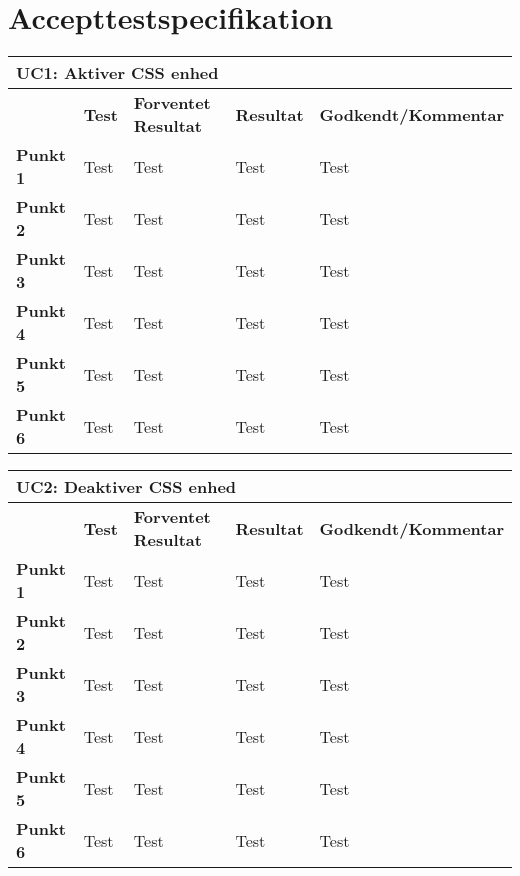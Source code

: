 \chapter{Accepttestspecifikation}

\begin{table}[htbp] \centering
\begin{tabular}{|l|l|l|l|l|} %
	\hline
\multicolumn{5}{|l|}{\textbf{UC1: Aktiver CSS enhed}} \\\hline
	&\textbf{Test} &\textbf{Forventet Resultat} &\textbf{Resultat} &\textbf{Godkendt/Kommentar} \\\hline
\textbf{Punkt 1}		&Test	&Test 	&Test	&Test \\\hline
\textbf{Punkt 2}		&Test	&Test 	&Test	&Test \\\hline
\textbf{Punkt 3}		&Test	&Test 	&Test	&Test \\\hline
\textbf{Punkt 4}		&Test	&Test 	&Test	&Test \\\hline
\textbf{Punkt 5}		&Test	&Test 	&Test	&Test \\\hline
\textbf{Punkt 6}		&Test	&Test 	&Test	&Test \\\hline
	\end{tabular}
	\label{ATUC1} 
\end{table}

\begin{table}[htbp] \centering
\begin{tabular}{|l|l|l|l|l|} %
	\hline
\multicolumn{5}{|l|}{\textbf{UC2: Deaktiver CSS enhed}} \\\hline
	&\textbf{Test} &\textbf{Forventet Resultat} &\textbf{Resultat} &\textbf{Godkendt/Kommentar} \\\hline
\textbf{Punkt 1}		&Test	&Test 	&Test	&Test \\\hline
\textbf{Punkt 2}		&Test	&Test 	&Test	&Test \\\hline
\textbf{Punkt 3}		&Test	&Test 	&Test	&Test \\\hline
\textbf{Punkt 4}		&Test	&Test 	&Test	&Test \\\hline
\textbf{Punkt 5}		&Test	&Test 	&Test	&Test \\\hline
\textbf{Punkt 6}		&Test	&Test 	&Test	&Test \\\hline
	\end{tabular}
	\label{ATUC2} 
\end{table}

